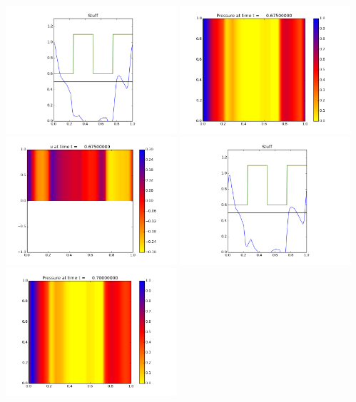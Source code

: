 \documentclass[11pt]{article}
\begin{document}
\vskip 10pt 
\includegraphics[width=0.475\textwidth]{frame0026fig3.png}
\vskip 10pt 
\includegraphics[width=0.475\textwidth]{frame0027fig0.png}
\includegraphics[width=0.475\textwidth]{frame0027fig1.png}
\vskip 10pt 
\includegraphics[width=0.475\textwidth]{frame0027fig3.png}
\vskip 10pt 
\includegraphics[width=0.475\textwidth]{frame0028fig0.png}
\end{document}

